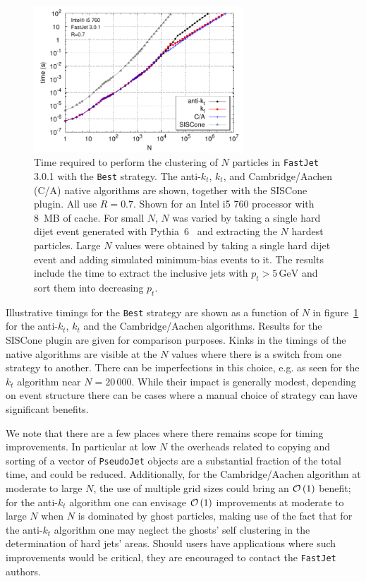 \documentclass[12pt,a4]{article}
\newcommand{\fastjet}{\texttt{FastJet}\xspace}
\newcommand{\ttt}[1]{{\small\texttt{#1}}}
\newcommand{\order}[1]{{\cal O}\left(#1\right)}
\newcommand{\GeV}{\,\text{GeV}}
\begin{document}
\begin{figure}[t]
  \centering
  \includegraphics[width=0.7\textwidth]{figs/timings_best_3_0_1}
  \caption{Time required to perform the clustering of $N$ particles in
    \fastjet 3.0.1 with the \ttt{Best} strategy. The anti-$k_t$,
    $k_t$, and Cambridge/Aachen (C/A) native algorithms are shown,
    together with the SISCone plugin.  All use $R=0.7$.
    Shown for an Intel i5 760 processor with 8~MB of
    cache.
    For small $N$, $N$ was varied by taking a single hard dijet event
    generated with Pythia~6~\cite{Sjostrand:2006za} and extracting the
    $N$ hardest particles. 
    Large $N$ values were obtained by taking a single hard dijet event
    and adding simulated minimum-bias events to it.  
    The results include the time to extract the inclusive jets with
    $p_t > 5\GeV$ and sort them into decreasing $p_t$.  }
\label{fig:timings}
\end{figure}

Illustrative timings for the \ttt{Best} strategy are shown as a
function of $N$ in figure~\ref{fig:timings} for the anti-$k_t$, $k_t$
and the Cambridge/Aachen algorithms. Results for the SISCone plugin
are given for comparison purposes.
%
Kinks in the timings of the native algorithms are visible at the $N$
values where there is a switch from one strategy to another.
%
There can be imperfections in this choice, e.g. as seen for the $k_t$
algorithm near $N=20\,000$. 
%
While their impact is generally modest, depending on event structure
there can be cases where a manual choice of strategy can have
significant benefits.
%

We note that there are a few places where there remains scope for
timing improvements. 
%
In particular at low $N$ the overheads related to copying and sorting
of a vector of \ttt{PseudoJet} objects are a substantial fraction of the
total time, and could be reduced.
%
Additionally, for the Cambridge/Aachen algorithm at moderate to large
$N$, the use of multiple grid sizes could bring an $\order{1}$
benefit;
%
for the anti-$k_t$ algorithm one can envisage $\order{1}$ improvements
at moderate to large $N$ when $N$ is dominated by ghost particles,
making use of the fact that for the anti-$k_t$ algorithm one may
neglect the ghosts' self clustering in the determination of hard jets'
areas.
%
Should users have applications where such improvements would be
critical, they are encouraged to contact the \fastjet authors.
\end{document}
